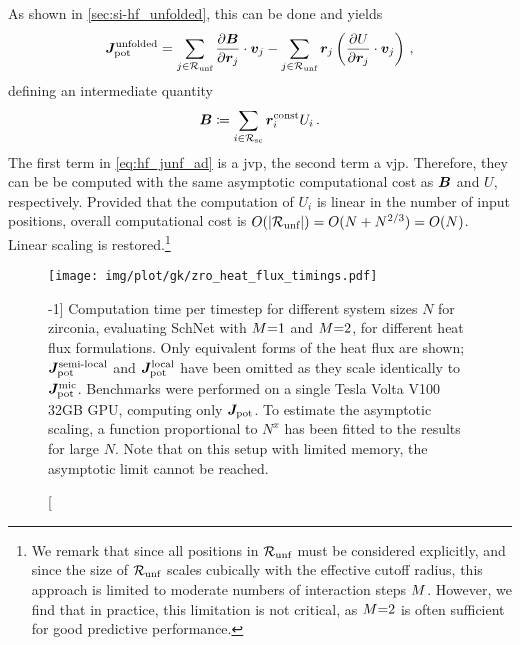 As shown in \cref{sec:si-hf_unfolded}, this can be done and yields
\begin{equation}
	\Junf = \sum_{j \in \Runf} \frac{\partial \Bary}{\partial \R_j} \cdot \V_j - \sum_{j \in \Runf} \R_j \left(  \dur{}{j}{} \cdot \V_j \right) \, , \label{eq:hf_junf_ad}
\end{equation}
defining an intermediate quantity
\begin{equation}
	\boldsymbol{B} \coloneqq \sum_{i \in \mathcal{R_{\text{sc}}}} \boldsymbol{r}^{\text{const}}_i U_i \, .
\end{equation}
The first term in \cref{eq:hf_junf_ad} is a \gls{jvp}, the second term a \gls{vjp}. Therefore, they can be be computed with the same asymptotic computational cost as $\boldsymbol{B}$ and $U$, respectively. Provided that the computation of $U_i$ is linear in the number of input positions, overall computational cost is $O(|\mathcal{R_{\text{unf}}}|) = O(N + N^{2/3}) = O(N)$. Linear scaling is restored.\footnote[][-3\baselineskip]{We remark that since all positions in $\mathcal{R_{\text{unf}}}$ must be considered explicitly, and since the size of $\mathcal{R_{\text{unf}}}$ scales cubically with the effective cutoff radius, this approach is limited to moderate numbers of interaction steps $M$. However, we find that in practice, this limitation is not critical, as $M{=}2$ is often sufficient for good predictive performance.}

\begin{figure}[t]
  \texttt{[image: img/plot/gk/zro\_heat\_flux\_timings.pdf]}
  \caption[][-1\baselineskip]{
  Computation time per timestep for different system sizes $N$ for zirconia, evaluating SchNet \mpnns with $M{=}1$ and $M{=}2$, for different heat flux formulations.
  Only equivalent forms of the heat flux are shown; $\boldsymbol{J}^{\text{semi-local}}_\text{pot}$ and $\boldsymbol{J}^{\text{local}}_\text{pot}$ have been omitted as they scale identically to $\boldsymbol{J}^{\text{mic}}_\text{pot}$.
  Benchmarks were performed on a single Tesla Volta V100 32GB GPU, computing only $\boldsymbol{J}_\text{pot}$.
  To estimate the asymptotic scaling, a function proportional to $N^x$ has been fitted to the results for large $N$. Note that on this setup with limited memory, the asymptotic limit cannot be reached.
  }
  \label{fig:hf_hf_timings}
\end{figure}


